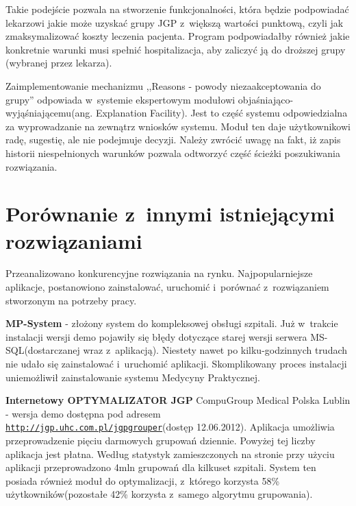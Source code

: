 Takie podejście pozwala na stworzenie funkcjonalności, która będzie podpowiadać lekarzowi jakie może uzyskać grupy JGP z~większą wartości punktową, czyli jak zmaksymalizować koszty leczenia pacjenta. Program podpowiadałby również jakie konkretnie warunki musi spełnić hospitalizacja, aby zaliczyć ją do droższej grupy (wybranej przez lekarza).

Zaimplementowanie mechanizmu ,,Reasons - powody niezaakceptowania do grupy'' odpowiada w~systemie ekspertowym modułowi objaśniająco-wyjąśniającemu(ang. Explanation Facility). Jest to część systemu odpowiedzialna za wyprowadzanie na zewnątrz wniosków systemu. Moduł ten daje użytkownikowi radę, sugestię, ale nie podejmuje decyzji\cite{martyniuk_ekspertowe}. Należy zwrócić uwagę na fakt, iż zapis historii niespełnionych warunków pozwala odtworzyć część ścieżki poszukiwania rozwiązania.


\section{Porównanie z~innymi istniejącymi rozwiązaniami}
\label{sec:porownanieZinnymiRozwiazaniami}

Przeanalizowano konkurencyjne rozwiązania na rynku. Najpopularniejsze aplikacje, postanowiono zainstalować, uruchomić i~porównać z~rozwiązaniem stworzonym na potrzeby pracy. %

\textbf{MP-System} - złożony system do kompleksowej obsługi szpitali. Już w~trakcie instalacji wersji demo pojawiły się błędy dotyczące starej wersji serwera MS-SQL(dostarczanej wraz z~aplikacją). Niestety nawet po kilku-godzinnych trudach nie udało się zainstalować i~uruchomić aplikacji. Skomplikowany proces instalacji uniemożliwił zainstalowanie systemu Medycyny Praktycznej.

\textbf{Internetowy OPTYMALIZATOR JGP} CompuGroup Medical Polska Lublin - wersja demo dostępna pod adresem \underline{\texttt{http://jgp.uhc.com.pl/jgpgrouper}}(dostęp 12.06.2012).
Aplikacja umożliwia przeprowadzenie pięciu darmowych grupowań dziennie. Powyżej tej liczby aplikacja jest płatna. Według statystyk zamieszczonych na stronie przy użyciu aplikacji przeprowadzono 4mln grupowań dla kilkuset szpitali. System ten posiada również moduł do optymalizacji, z~którego korzysta 58\% użytkowników(pozostałe 42\% korzysta z~samego algorytmu grupowania).

